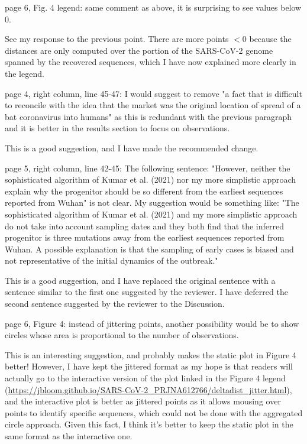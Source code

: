 \documentclass[11pt, oneside]{article}   	%
\newcommand{\response}[1]{{\color{black}#1}}
\begin{document}
page 6, Fig. 4 legend: same comment as above, it is surprising to see values below 0. 

\response{See my response to the previous point. There are more points $< 0$ because the distances are only computed over the portion of the SARS-CoV-2 genome spanned by the recovered sequences, which I have now explained more clearly in the legend.}

page 4, right column, line 45-47: I would suggest to remove "a fact that is difficult to reconcile with the idea that the market was the original location of spread of a bat coronavirus into humans" as this is redundant with the previous paragraph and it is better in the results section to focus on observations.

\response{This is a good suggestion, and I have made the recommended change.}

page 5, right column, line 42-45: The following sentence: "However, neither the sophisticated algorithm of Kumar et al. (2021) nor my more simplistic approach explain why the progenitor should be so different from the earliest sequences reported from Wuhan" is not clear. My suggestion would be something like: "The sophisticated algorithm of Kumar et al. (2021) and my more simplistic approach do not take into account sampling dates and they both find that the inferred progenitor is three mutations away from the earliest sequences reported from Wuhan. A possible explanation is that the sampling of early cases is biased and not representative of the initial dynamics of the outbreak."

\response{This is a good suggestion, and I have replaced the original sentence with a sentence similar to the first one suggested by the reviewer. I have deferred the second sentence suggested by the reviewer to the Discussion.}

page 6, Figure 4: instead of jittering points, another possibility would be to show circles whose area is proportional to the number of observations.

\response{This is an interesting suggestion, and probably makes the static plot in Figure 4 better! However, I have kept the jittered format as my hope is that readers will actually go to the interactive version of the plot linked in the Figure 4 legend (\url{https://jbloom.github.io/SARS-CoV-2_PRJNA612766/deltadist_jitter.html}), and the interactive plot is better as jittered points as it allows mousing over points to identify specific sequences, which could not be done with the aggregated circle approach. Given this fact, I think it's better to keep the static plot in the same format as the interactive one.}
\end{document}
